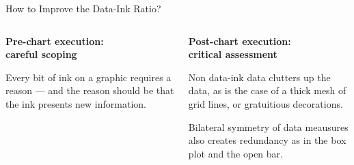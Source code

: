 \documentclass[notes, aspectratio=1610]{beamer}
\begin{document}
\begin{frame}{How to Improve the Data-Ink Ratio?}
	\begin{columns}[t]
		\begin{column}{0.5\textwidth}
			\begin{center}
			\textbf{Pre-chart execution:\\careful scoping}
			\end{center}
			\small
			\pause
			\begin{tcolorbox}[
                        	colback=blue!5!white,
                        	colframe=blue!60!black,
                        	title={
					\centering
					!! Maximize the data-ink ratio !!
				}]
				\raggedright Every bit of ink on a graphic requires a reason 
				--- and the reason should be that the ink presents 
				new information.
                        \end{tcolorbox}

		\end{column}
		\pause
		\begin{column}{0.5\textwidth}
			\begin{center}
			\textbf{Post-chart execution:\\critical assessment}
			\end{center}
			\pause
			\small
			\begin{tcolorbox}[
                        	colback=blue!5!white,
                        	colframe=blue!60!green,
                        	title={
					\centering
					!! Erase the non data-ink !!
				}]
				\raggedright Non data-ink data clutters up the data, as is the case 
				of a thick mesh of grid lines, or gratuitious 
				decorations.
			\end{tcolorbox}
		
			\pause

			\begin{tcolorbox}[
                        	colback=blue!5!white,
                        	colframe=blue!60!green,
                        	title={
					\centering
					!! Erase redundant data-ink !!		
				}]
				\raggedright Bilateral symmetry of data meausures also creates 
				redundancy as in the box plot and the open bar.
			\end{tcolorbox}
			
		\end{column}
	\end{columns}
\end{frame}

\end{document}
